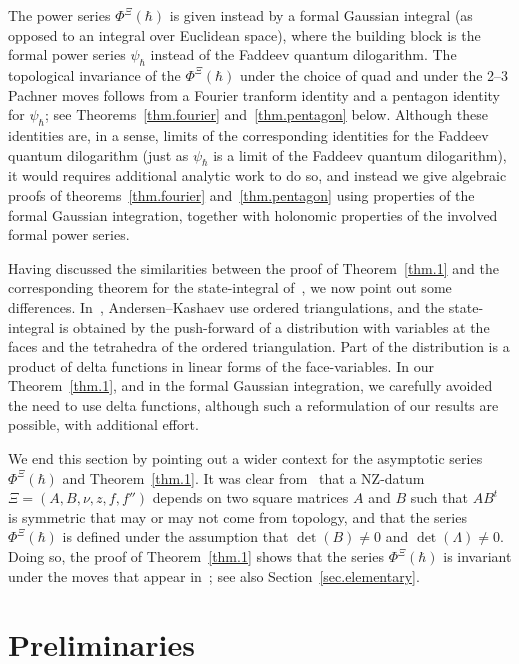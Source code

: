 \documentclass[12pt,reqno]{amsart}
\theoremstyle{definition}
\renewcommand{\=}{\;=\;}
\begin{document}
The power series $\Phi^\Xi(\hbar)$ is given instead by a formal Gaussian integral
(as opposed to an integral over Euclidean space), where the building block is
the formal power series $\psi_\hbar$ instead of the Faddeev
quantum dilogarithm. The topological invariance of the $\Phi^\Xi(\hbar)$ under
the choice of quad and under the 2--3 Pachner moves follows from a Fourier tranform
identity and a pentagon identity for $\psi_\hbar$; see Theorems~\ref{thm.fourier}
and~\ref{thm.pentagon} below. Although these identities are, in a sense, limits of
the corresponding identities for the Faddeev quantum dilogarithm (just as
$\psi_\hbar$ is a limit of the Faddeev quantum dilogarithm), it would requires
additional analytic work to do so, and instead we give algebraic proofs of
theorems~\ref{thm.fourier} and~\ref{thm.pentagon} using properties of the
formal Gaussian integration, together with holonomic properties of the involved
formal power series.

Having discussed the similarities between the proof of Theorem~\ref{thm.1} and
the corresponding theorem for the state-integral of~\cite{AK}, we now point out
some differences. In~\cite{AK}, Andersen--Kashaev use ordered triangulations,
and the state-integral is
obtained by the push-forward of a distribution with variables at the faces and
the tetrahedra of the ordered triangulation. Part of the distribution is a product
of delta functions in linear forms of the face-variables. In our Theorem~\ref{thm.1},
and in the formal Gaussian integration, we carefully avoided the need to use
delta functions, although such a reformulation of our results are possible, with
additional effort.

We end this section by pointing out a wider context for the asymptotic series
$\Phi^\Xi(\hbar)$ and Theorem~\ref{thm.1}. It was clear from~\cite{DG} that
a NZ-datum $\Xi=(A,B,\nu,z,f,f'')$ depends on two square matrices $A$ and $B$
such that $AB^t$ is symmetric that may or may not come from topology, and that
the series $\Phi^\Xi(\hbar)$ is defined under the assumption that $\det(B) \neq 0$
and $\det(\Lambda) \neq 0$. Doing so, the proof of Theorem~\ref{thm.1} shows that
the series $\Phi^\Xi(\hbar)$ is invariant under the moves that appear
in~\cite[Sec.6]{GZ:kashaev}; see also Section~\ref{sec.elementary}. 


\section{Preliminaries}
\label{sec.preliminaries}
\end{document}

